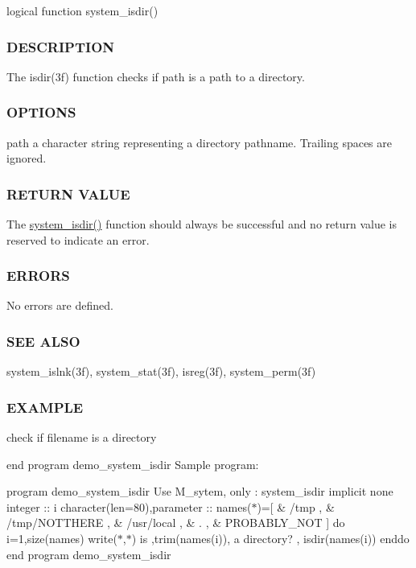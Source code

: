 \begin{DoxyVerb}logical function system_isdir()
\end{DoxyVerb}


\subsubsection*{D\+E\+S\+C\+R\+I\+P\+T\+I\+ON}

The isdir(3f) function checks if path is a path to a directory.

\subsubsection*{O\+P\+T\+I\+O\+NS}

path a character string representing a directory pathname. Trailing spaces are ignored.

\subsubsection*{R\+E\+T\+U\+RN V\+A\+L\+UE}

The \hyperlink{namespacem__system_ad097988a031e64b4f21f856cf45c9c73}{system\+\_\+isdir()} function should always be successful and no return value is reserved to indicate an error.

\subsubsection*{E\+R\+R\+O\+RS}

No errors are defined.

\subsubsection*{S\+EE A\+L\+SO}

system\+\_\+islnk(3f), system\+\_\+stat(3f), isreg(3f), system\+\_\+perm(3f)

\subsubsection*{E\+X\+A\+M\+P\+LE}

check if filename is a directory

end program demo\+\_\+system\+\_\+isdir Sample program\+:

program demo\+\_\+system\+\_\+isdir Use M\+\_\+sytem, only \+: system\+\_\+isdir implicit none integer \+:\+: i character(len=80),parameter \+:\+: names($\ast$)=\mbox{[} \& \textquotesingle{}/tmp \textquotesingle{}, \& \textquotesingle{}/tmp/\+N\+O\+T\+T\+H\+E\+RE \textquotesingle{}, \& \textquotesingle{}/usr/local \textquotesingle{}, \& \textquotesingle{}. \textquotesingle{}, \& \textquotesingle{}P\+R\+O\+B\+A\+B\+L\+Y\+\_\+\+N\+OT \textquotesingle{}\mbox{]} do i=1,size(names) write($\ast$,$\ast$)\textquotesingle{} is \textquotesingle{},trim(names(i)),\textquotesingle{} a directory? \textquotesingle{}, isdir(names(i)) enddo end program demo\+\_\+system\+\_\+isdir

